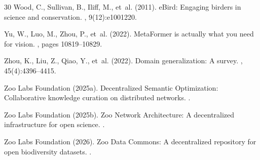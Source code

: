 \documentclass[11pt,a4paper]{article}
\begin{document}
\begin{thebibliography}{30}
Wood, C., Sullivan, B., Iliff, M., et~al. (2011).
\newblock eBird: Engaging birders in science and conservation.
, 9(12):e1001220.

Yu, W., Luo, M., Zhou, P., et~al. (2022).
\newblock MetaFormer is actually what you need for vision.
, pages 10819--10829.

Zhou, K., Liu, Z., Qiao, Y., et~al. (2022).
\newblock Domain generalization: A survey.
, 45(4):4396--4415.

Zoo Labs Foundation (2025a).
\newblock Decentralized Semantic Optimization: Collaborative knowledge curation on distributed networks.
.

Zoo Labs Foundation (2025b).
\newblock Zoo Network Architecture: A decentralized infrastructure for open science.
.

Zoo Labs Foundation (2026).
\newblock Zoo Data Commons: A decentralized repository for open biodiversity datasets.
.

\end{thebibliography}
\end{document}
